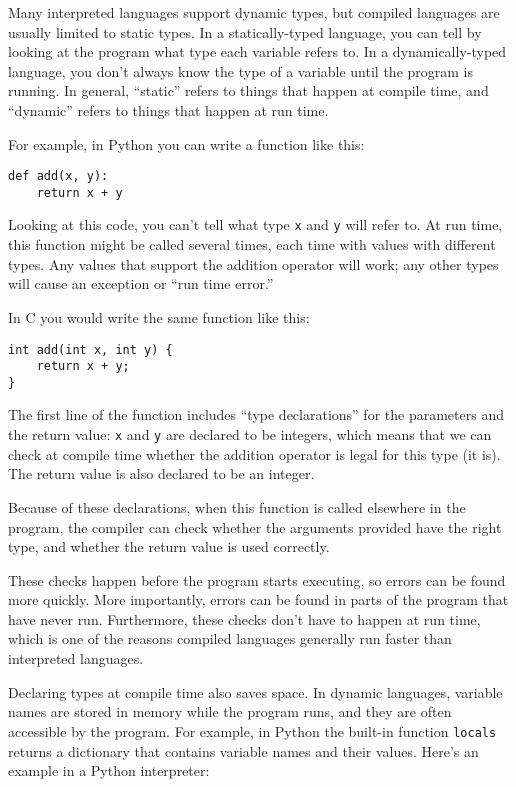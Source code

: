 \documentclass[12pt]{book}
\begin{document}
Many interpreted languages support dynamic types, but compiled
languages are usually limited to static types.  In a statically-typed
language, you can tell by looking at the program what type each
variable refers to.  In a dynamically-typed language,
you don't always know the type of a variable until the
program is running.  In general, ``static'' refers to things that
happen at compile time, and ``dynamic'' refers to things that happen
at run time.

For example, in Python you can write a function like this:

\begin{verbatim}
def add(x, y):
    return x + y
\end{verbatim}

Looking at this code, you can't tell what type {\tt x} and {\tt y}
will refer to.  At run time, this function might be called several
times, each time with values with different types.  Any values that
support the addition operator will work; any other types will cause an
exception or ``run time error.''

In C you would write the same function like this:

\begin{verbatim}
int add(int x, int y) {
    return x + y;
}
\end{verbatim}

The first line of the function includes ``type declarations'' for the
parameters and the return value: {\tt x} and {\tt y} are declared to
be integers, which means that we can check at compile time
whether the addition operator is legal for this type (it is).  The
return value is also declared to be an integer.

Because of these declarations, when this function is called elsewhere
in the program, the compiler can check whether the arguments provided
have the right type, and whether the return value is used correctly.

These checks happen before the program starts executing, so errors can
be found more quickly.  More importantly, errors can be found in parts
of the program that have never run.  Furthermore, these checks don't
have to happen at run time, which is one of the reasons compiled
languages generally run faster than interpreted languages.

Declaring types at compile time also saves space.  In dynamic
languages, variable names are stored in memory while the program runs,
and they are often accessible by the program.  For example, in Python
the built-in function {\tt locals} returns a dictionary that contains
variable names and their values.  Here's an example in a Python
interpreter:
\end{document}
